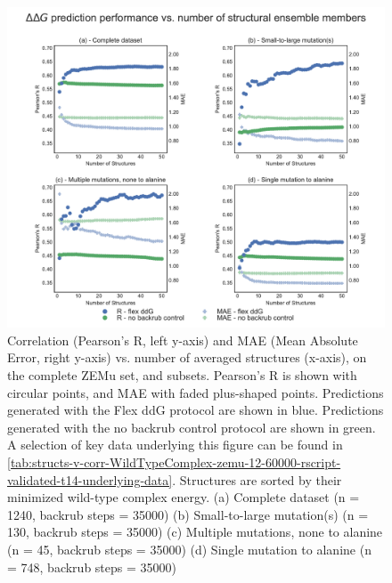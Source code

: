 \begin{figure}
  \includegraphics[width=\textwidth,keepaspectratio]{structs-v-corr-WildTypeComplex-zemu-12-60000-rscript-validated-t14.pdf}
  \caption[]{ %
    Correlation (Pearson's R, left y-axis) and MAE (Mean Absolute Error, right y-axis) vs. number of averaged structures (x-axis), on the complete ZEMu set, and subsets.
    Pearson's R is shown with circular points, and MAE with faded plus-shaped points.
    Predictions generated with the Flex ddG protocol are shown in blue.
    Predictions generated with the no backrub control protocol are shown in green.
    A selection of key data underlying this figure can be found in \cref{tab:structs-v-corr-WildTypeComplex-zemu-12-60000-rscript-validated-t14-underlying-data}.
    Structures are sorted by their minimized wild-type complex energy.
    (a) Complete dataset (n = 1240, backrub steps = 35000)
    (b) Small-to-large mutation(s) (n = 130, backrub steps = 35000)
    (c) Multiple mutations, none to alanine (n = 45, backrub steps = 35000)
    (d) Single mutation to alanine (n = 748, backrub steps = 35000)
  } \label{fig:structs-v-corr-WildTypeComplex-zemu-12-60000-rscript-validated-t14}
\end{figure}
